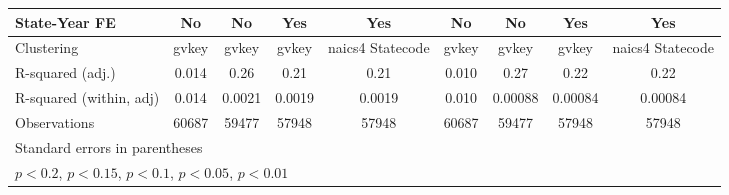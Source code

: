 {\begin{tabular}{l*{8}{c}}
\addlinespace
State-Year FE       &          No         &          No         &         Yes         &         Yes         &          No         &          No         &         Yes         &         Yes         \\
\midrule
Clustering          &       gvkey         &       gvkey         &       gvkey         &naics4 Statecode         &       gvkey         &       gvkey         &       gvkey         &naics4 Statecode         \\
R-squared (adj.)    &       0.014         &        0.26         &        0.21         &        0.21         &       0.010         &        0.27         &        0.22         &        0.22         \\
R-squared (within, adj)&       0.014         &      0.0021         &      0.0019         &      0.0019         &       0.010         &     0.00088         &     0.00084         &     0.00084         \\
Observations        &       60687         &       59477         &       57948         &       57948         &       60687         &       59477         &       57948         &       57948         \\
\bottomrule
\multicolumn{9}{l}{\footnotesize Standard errors in parentheses}\\
\multicolumn{9}{l}{\footnotesize \sym{++} \(p<0.2\), \sym{+} \(p<0.15\), \sym{*} \(p<0.1\), \sym{**} \(p<0.05\), \sym{***} \(p<0.01\)}\\
\end{tabular}
}
